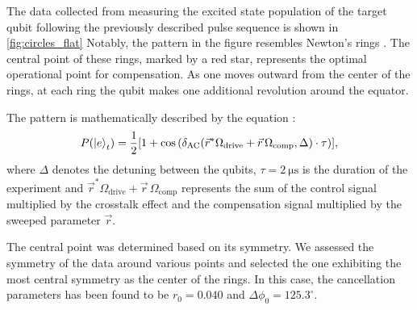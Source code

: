 The data collected from measuring the excited state population of the target qubit following the previously described pulse sequence is shown in \cref{fig:circles_flat}
Notably, the pattern in the figure resembles Newton's rings \cite{newton}.
The central point of these rings, marked by a red star, represents the optimal operational point for compensation.
As one moves outward from the center of the rings, at each ring the qubit makes one additional revolution around the equator.

The pattern is mathematically described by the equation \cite{crosstalk}:
\begin{equation}
P(\ket{e}_t) = \frac{1}{2}[1 + \cos\left( \delta_{\text{AC}} (\vec{r}^* \Omega_\text{drive} + \vec{r} \, \Omega_\text{comp}, \Delta) \cdot \tau \right)] ,
\end{equation}
where $\Delta$ denotes the detuning between the qubits, $\tau = \SI{2}{\micro \second}$ is the duration of the experiment and $\vec{r}^* \Omega_\text{drive} + \vec{r} \, \Omega_\text{comp}$ represents the sum of the control signal multiplied by the crosstalk effect and the compensation signal multiplied by the sweeped parameter $\vec{r}$.

The central point was determined based on its symmetry.
We assessed the symmetry of the data around various points and selected the one exhibiting the most central symmetry as the center of the rings.
In this case, the cancellation parameters has been found to be $r_0 = 0.040$ and $\Delta \phi_0 = 125.3^\circ$.

